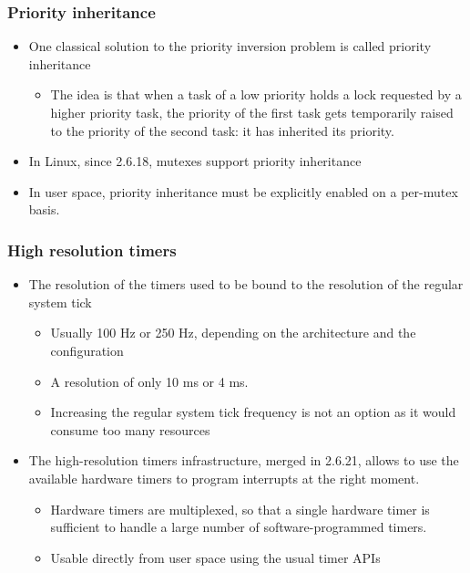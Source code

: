 \begin{frame}
  \frametitle{Priority inheritance}
  \begin{itemize}
  \item One classical solution to the priority inversion problem is
    called priority inheritance
    \begin{itemize}
    \item The idea is that when a task of a low priority holds a lock
      requested by a higher priority task, the priority of the first
      task gets temporarily raised to the priority of the second task:
      it has inherited its priority.
    \end{itemize}
  \item In Linux, since 2.6.18, mutexes support priority inheritance
  \item In user space, priority inheritance must be explicitly enabled
    on a per-mutex basis.
  \end{itemize}
\end{frame}

\begin{frame}
  \frametitle{High resolution timers}
  \begin{itemize}
  \item The resolution of the timers used to be bound to the
    resolution of the regular system tick
    \begin{itemize}
    \item Usually 100 Hz or 250 Hz, depending on the architecture and
      the configuration
    \item A resolution of only 10 ms or 4 ms.
    \item Increasing the regular system tick frequency is not an
      option as it would consume too many resources
    \end{itemize}
  \item The high-resolution timers infrastructure, merged in 2.6.21,
    allows to use the available hardware timers to program interrupts
    at the right moment.
    \begin{itemize}
    \item Hardware timers are multiplexed, so that a single hardware
      timer is sufficient to handle a large number of
      software-programmed timers.
    \item Usable directly from user space using the usual timer APIs
    \end{itemize}
  \end{itemize}
\end{frame}

